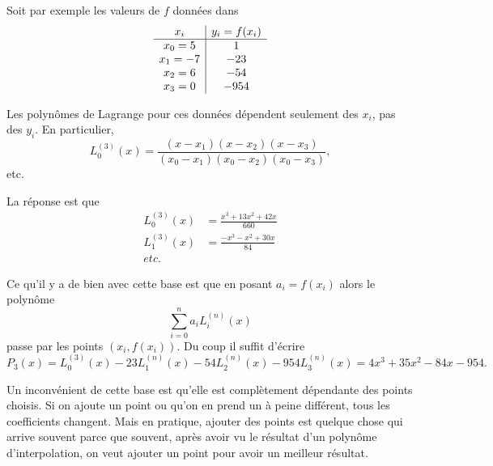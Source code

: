 Soit par exemple les valeurs de \( f\) données dans
\begin{equation*}
    \begin{array}[]{c|c}
        x_i&y_i=f(x_i)\\
        \hline
        x_0=5&1\\
        x_1=-7&-23\\
        x_2=6&-54\\
        x_3=0&-954\\
    \end{array}
\end{equation*}

Les polynômes de Lagrange pour ces données dépendent seulement des \( x_i\), pas des \( y_i\). En particulier,
\begin{equation}
    L_0^{(3)}(x)=\frac{ (x-x_1)(x-x_2)(x-x_3) }{ (x_0-x_1)(x_0-x_2)(x_0-x_3) },
\end{equation}
etc.

La réponse est que
\begin{subequations}
    \begin{align}
        L_0^{(3)}(x)&=\frac{ x^3+13x^2+42x }{ 660 }\\
        L_1^{(3)}(x)&=\frac{ -x^3-x^2+30x  }{ 84 }\\
        etc.
    \end{align}
\end{subequations}

Ce qu'il y a de bien avec cette base est que en posant \( a_i=f(x_i)\) alors le polynôme
\begin{equation}
    \sum_{i=0}^na_iL_i^{(n)}(x)
\end{equation}
passe par les points \( (x_i,f(x_i))\). Du coup il suffit d'écrire
\begin{equation}
    P_3(x)=L_0^{(3)}(x)-23L_1^{(n)}(x)-54L_2^{(n)}(x)-954 L_3^{(n)}(x)=4x^3+35x^2-84x-954.
\end{equation}

Un inconvénient de cette base est qu'elle est complètement dépendante des points choisis. Si on ajoute un point ou qu'on en prend un à peine différent, tous les coefficients changent. Mais en pratique, ajouter des points est quelque chose qui arrive souvent parce que souvent, après avoir vu le résultat d'un polynôme d'interpolation, on veut ajouter un point pour avoir un meilleur résultat.

